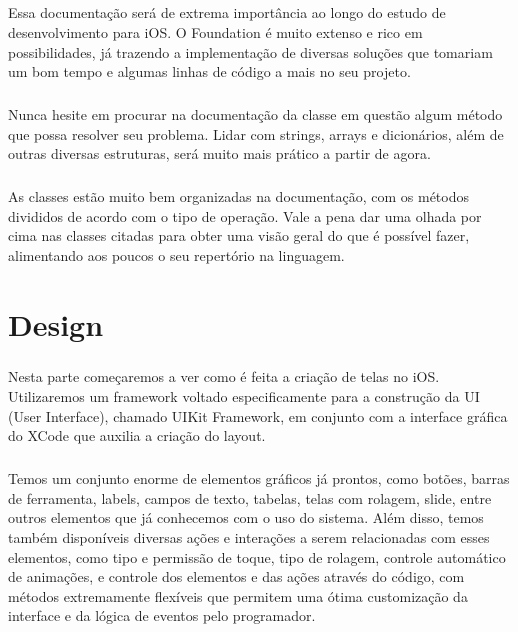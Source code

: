 \documentclass[a4paper,12pt,brazil,doubleside]{book}
\begin{document}
\paragraph{}Essa documentação será de extrema importância ao longo do estudo de desenvolvimento para iOS. O Foundation é muito extenso e rico em possibilidades, já trazendo a implementação de diversas soluções que tomariam um bom tempo e algumas linhas de código a mais no seu projeto.
\paragraph{}Nunca hesite em procurar na documentação da classe em questão algum método que possa resolver seu problema. Lidar com strings, arrays e dicionários, além de outras diversas estruturas, será muito mais prático a partir de agora.
\paragraph{}As classes estão muito bem organizadas na documentação, com os métodos divididos de acordo com o tipo de operação. Vale a pena dar uma olhada por cima nas classes citadas para obter uma visão geral do que é possível fazer, alimentando aos poucos o seu repertório na linguagem.


\chapter{Design}

\paragraph{}Nesta parte começaremos a ver como é feita a criação de telas no iOS. Utilizaremos um framework voltado especificamente para a construção da UI (User Interface), chamado UIKit Framework, em conjunto com a interface gráfica do XCode que auxilia a criação do layout.
\paragraph{}Temos um conjunto enorme de elementos gráficos já prontos, como botões, barras de ferramenta, labels, campos de texto, tabelas, telas com rolagem, slide, entre outros elementos que já conhecemos com o uso do sistema. Além disso, temos também disponíveis diversas ações e interações a serem relacionadas com esses elementos, como tipo e permissão de toque, tipo de rolagem, controle automático de animações, e controle dos elementos e das ações através do código, com métodos extremamente flexíveis que permitem uma ótima customização da interface e da lógica de eventos pelo programador.
\end{document}
